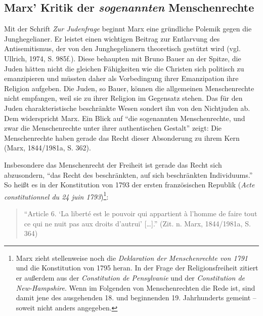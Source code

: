 \documentclass[ngerman,12pt, titlepage, smallheadings, nomath]{scrartcl}
\begin{document}
\subsection{\texorpdfstring{Marx' Kritik der \emph{sogenannten}
Menschenrechte}{Marx' Kritik der sogenannten Menschenrechte}}\label{marx-kritik-der-sogenannten-menschenrechte}

Mit der Schrift \emph{Zur Judenfrage} beginnt Marx eine gründliche
Polemik gegen die Junghegelianer. Er leistet einen wichtigen Beitrag zur
Entlarvung des Antisemitismus, der von den Junghegelianern theoretisch
gestützt wird (vgl. Ullrich, 1974, S. 985f.). Diese behaupten mit Bruno
Bauer an der Spitze, die Juden hätten nicht die gleichen Fähigkeiten wie
die Christen sich politisch zu emanzipieren und müssten daher als
Vorbedingung ihrer Emanzipation ihre Religion aufgeben. Die Juden, so
Bauer, können die allgemeinen Menschenrechte nicht empfangen, weil sie
zu ihrer Religion im Gegensatz stehen. Das für den Juden
charakteristische beschränkte Wesen sondert ihn von den Nichtjuden ab.
Dem widerspricht Marx. Ein Blick auf \enquote{die sogenannten
Menschenrechte, und zwar die Menschenrechte unter ihrer authentischen
Gestalt} zeigt: Die Menschenrechte haben gerade das Recht dieser
Absonderung zu ihrem Kern (Marx, 1844/1981a, S. 362).

Insbesondere das Menschenrecht der Freiheit ist gerade das Recht sich
abzusondern, \enquote{das Recht des beschränkten, auf sich beschränkten
Individuums.} So heißt es in der Konstitution von 1793 der ersten
französischen Republik (\emph{Acte constitutionnel du 24 juin
1793})\footnote{Marx zieht stellenweise noch die \emph{Deklaration der
  Menschenrechte von 1791} und die Konstitution von 1795 heran. In der
  Frage der Religionsfreiheit zitiert er außerdem aus der
  \emph{Constitution de Pensylvanie} und der \emph{Constitution de
  New-Hampshire}. Wenn im Folgenden von Menschenrechten die Rede ist,
  sind damit jene des ausgehenden 18. und beginnenden 19. Jahrhunderts
  gemeint -- soweit nicht anders angegeben.}:

\begin{quote}
\enquote{Article 6. \enquote{La liberté est le pouvoir qui appartient à
l'homme de faire tout ce qui ne nuit pas aux droits d'autrui}
{[}\ldots{}{]}.} (Zit. n. Marx, 1844/1981a, S. 364)
\end{quote}
\end{document}
